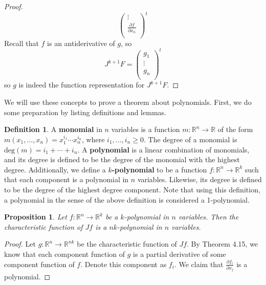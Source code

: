 \documentclass{article}
\theoremstyle{plain} %
\numberwithin{thm}{section} %
\newtheorem{prop}[thm]{Proposition}
\theoremstyle{definition}
\newtheorem{defn}[thm]{Definition}
\begin{document}
\begin{proof}
\[\begin{pmatrix}
                \vdots \\
                \frac{\partial f}{\partial x_n} \\
            \end{pmatrix}^t
        \]
        Recall that \(f\) is an antiderivative of \(g\), so
        \[
            J^{k+1} F =
            \begin{pmatrix}
                g_1 \\
                \vdots \\
                g_n \\
           \end{pmatrix}^t
        \]
        so \(g\) is indeed the function representation for \(J^{k+1} F\).
    \end{proof}

    We will use these concepts to prove a theorem about polynomials. First, we do some preparation by listing definitions and lemmas.
    \begin{defn}
        A \textbf{monomial} in \(n\) variables is a function \(m : \mathbb{R}^n \to \mathbb{R}\) of the form \(m(x_1, ..., x_n) = x_1^{i_1}\cdots x_n^{i_n}\), where \(i_1, ..., i_n \geq 0\). The degree of a monomial is \(\mathrm{deg} (m) = i_1 + \cdots + i_n\). A \textbf{polynomial} is a linear combination of monomials, and its degree is defined to be the degree of the monomial with the highest degree. Additionally, we define a \textbf{\(k\)-polynomial} to be a function \(f: \mathbb{R}^n \to \mathbb{R}^k\) such that each component is a polynomial in \(n\) variables. Likewise, its degree is defined to be the degree of the highest degree component. Note that using this definition, a polynomial in the sense of the above definition is considered a 1-polynomial.
    \end{defn}
    \begin{prop}
        Let \(f: \mathbb{R}^n \to \mathbb{R}^k\) be a \(k\)-polynomial in \(n\) variables. Then the characteristic function of \(Jf\) is a \(nk\)-polynomial in \(n\) variables.
    \end{prop}
    \begin{proof}
        Let \(g: \mathbb{R}^n \to \mathbb{R}^{nk}\) be the characteristic function of \(Jf\). By Theorem 4.15, we know that each component function of \(g\) is a partial derivative of some component function of \(f\). Denote this component as \(f_i\). We claim that \(\frac{\partial f_i}{\partial x_j}\) is a polynomial.
    \end{proof}
\end{document}
